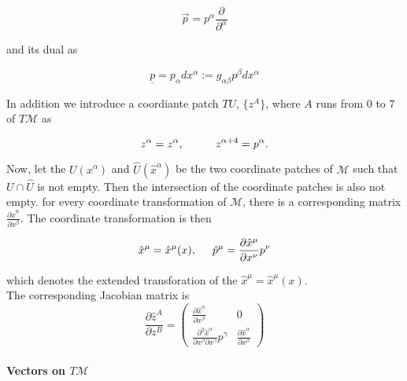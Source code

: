 \documentclass[11pt,a4paper,headinclude=true,DIV=14,BCOR=8mm,chapterprefix,listof=totoc,twoside,openright,abstracton]{scrbook}
\begin{document}
\begin{equation}
    \vec{p} = p^{\alpha}\frac{\partial}{\partial^{\alpha}}
\end{equation}

and its dual as 

\begin{equation}
    \underline{p} = p_{\alpha}dx^{\alpha}:=g_{\alpha\beta}p^{\beta}dx^{\alpha}
\end{equation}

In addition we introduce a coordiante patch $TU$, $\{z^A\}$, where $A$ runs from $0$ to $7$ of $T\mathcal{M}$ as 

\begin{equation}
    z^{\alpha} = z^{\alpha}, \hspace{10mm} z^{\alpha+4} = p^{\alpha}.
\end{equation}

Now, let the $U(x^{\alpha})$ and $\hat{U}(\hat{x}^{\alpha})$ be the two coordinate patches of $\mathcal{M}$ such that $U\cap\hat{U}$ is not empty. Then the intersection of the coordinate patches is also not empty. 
for every coordinate transformation of $\mathcal{M}$, there is a corresponding matrix $\frac{\partial \hat{x}^{\alpha}}{\partial x^{\beta}}$.
The coordinate transformation is then

\begin{equation}
    \hat{x}^{\mu} = \hat{x}^{\mu}(x), \hspace{5mm} \hat{p}^{\mu} = \frac{\partial\hat{x}^{\mu}}{\partial x^{\nu}}p^{\nu}
\end{equation}

which denotes the extended transforation of the $\hat{x}^{\mu} = \hat{x}^{\mu}(x)$. \\


The corresponding Jacobian matrix is 
\renewcommand\arraystretch{1.6} %
\begin{equation}
\frac{\partial\hat{z}^A}{\partial z^B} = 
    \begin{pmatrix}
    \frac{\partial\hat{x}^{\alpha}}{\partial x^{\beta}} & 0 \\
    \frac{\partial^2\hat{x}^{\alpha}}{\partial x^{\beta} \partial x^{\gamma}}p^{\gamma} & \frac{\partial\hat{x}^{\alpha}}{\partial x^{\beta}} 
    \end{pmatrix}
\end{equation}
\renewcommand\arraystretch{1.0}




\paragraph{Vectors on $T\mathcal{M}$}
\end{document}
